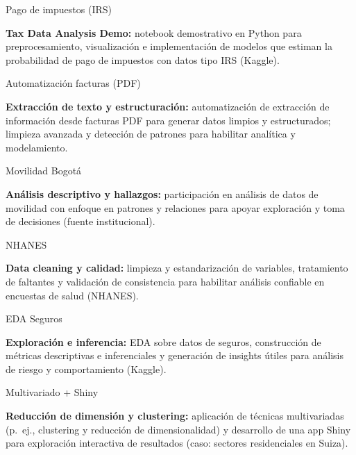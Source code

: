 \begin{cvskills}

  \cvskill
    {\begin{minipage}[t]{0.28\linewidth}Pago de impuestos (IRS)\end{minipage}}
    {\parbox[t]{0.72\linewidth}{\textbf{Tax Data Analysis Demo:} notebook demostrativo en Python para preprocesamiento, visualización e implementación de modelos que estiman la probabilidad de pago de impuestos con datos tipo IRS (Kaggle).}}

  \cvskill
    {\begin{minipage}[t]{0.28\linewidth}Automatización facturas (PDF)\end{minipage}}
    {\parbox[t]{0.72\linewidth}{\textbf{Extracción de texto y estructuración:} automatización de extracción de información desde facturas PDF para generar datos limpios y estructurados; limpieza avanzada y detección de patrones para habilitar analítica y modelamiento.}}

  \cvskill
    {\begin{minipage}[t]{0.28\linewidth}Movilidad Bogotá\end{minipage}}
    {\parbox[t]{0.72\linewidth}{\textbf{Análisis descriptivo y hallazgos:} participación en análisis de datos de movilidad con enfoque en patrones y relaciones para apoyar exploración y toma de decisiones (fuente institucional).}}

  \cvskill
    {\begin{minipage}[t]{0.28\linewidth}NHANES\end{minipage}}
    {\parbox[t]{0.72\linewidth}{\textbf{Data cleaning y calidad:} limpieza y estandarización de variables, tratamiento de faltantes y validación de consistencia para habilitar análisis confiable en encuestas de salud (NHANES).}}

  \cvskill
    {\begin{minipage}[t]{0.28\linewidth}EDA Seguros\end{minipage}}
    {\parbox[t]{0.72\linewidth}{\textbf{Exploración e inferencia:} EDA sobre datos de seguros, construcción de métricas descriptivas e inferenciales y generación de insights útiles para análisis de riesgo y comportamiento (Kaggle).}}

  \cvskill
    {\begin{minipage}[t]{0.28\linewidth}Multivariado + Shiny\end{minipage}}
    {\parbox[t]{0.72\linewidth}{\textbf{Reducción de dimensión y clustering:} aplicación de técnicas multivariadas (p.\ ej., clustering y reducción de dimensionalidad) y desarrollo de una app Shiny para exploración interactiva de resultados (caso: sectores residenciales en Suiza).}}


\end{cvskills}
